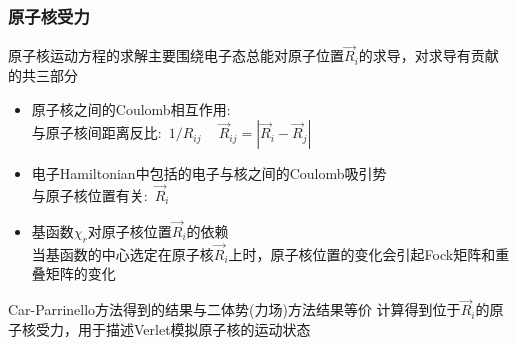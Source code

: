 {%
%
\frame
{
	\frametitle{原子核受力}
	原子核运动方程的求解主要围绕电子态总能对原子位置$\vec R_i$的求导，对求导有贡献的共三部分
	\begin{itemize}
		\item 原子核之间的\textrm{Coulomb}相互作用:\\
			与原子核间距离反比:~$1/R_{ij}~\quad\vec R_{ij}=|\vec R_i-\vec R_j|$
		\item 电子\textrm{Hamiltonian}中包括的电子与核之间的\textrm{Coulomb}吸引势\\
			与原子核位置有关:~$\vec R_i$
		\item 基函数$\chi_r$对原子核位置$\vec R_i$的依赖\\
			当基函数的中心选定在原子核$\vec R_i$上时，原子核位置的变化会引起\textrm{Fock}矩阵和重叠矩阵的变化\\
	{\fontsize{7.2pt}{5.2pt}}
	\end{itemize}
	\textrm{Car-Parrinello}方法得到的结果与二体势(力场)方法结果等价
	\vskip 5pt
	计算得到位于$\vec R_i$的原子核受力，用于描述\textrm{Verlet}模拟原子核的运动状态
}

}
